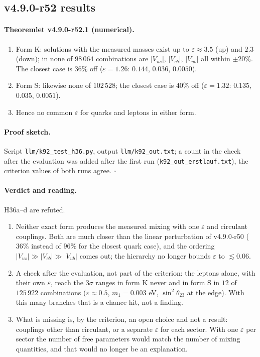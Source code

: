\subsection*{v4.9.0-r52 results}
\label{subsec:v490-r52-results}

\paragraph{Theoremlet v4.9.0-r52.1 (numerical).}
\begin{enumerate}[leftmargin=2em]
\item[(a)] Form K: solutions with the measured masses exist up to \(\varepsilon\approx3.5\) (up) and \(2.3\) (down); in none of \(98\,064\)
combinations are \(|V_{us}|\), \(|V_{cb}|\), \(|V_{ub}|\) all within \(\pm20\%\).  The closest case is \(36\%\) off
(\(\varepsilon=1.26\): \(0.144\), \(0.036\), \(0.0050\)).
\item[(b)] Form S: likewise none of \(102\,528\); the closest case is \(40\%\) off (\(\varepsilon=1.32\): \(0.135\), \(0.035\), \(0.0051\)).
\item[(c)] Hence no common \(\varepsilon\) for quarks and leptons in either form.
\end{enumerate}

\paragraph{Proof sketch.}
Script \texttt{llm/k92\_test\_h36.py}, output \texttt{llm/k92\_out.txt}; a count in the check after the evaluation was added after the first run
(\texttt{k92\_out\_erstlauf.txt}), the criterion values of both runs agree.  \(\square\)

\paragraph{Verdict and reading.}
H36a--d are refuted.
\begin{enumerate}[leftmargin=2em]
\item Neither exact form produces the measured mixing with one \(\varepsilon\) and circulant couplings.  Both are much closer than the linear
perturbation of v4.9.0-r50 (\(36\%\) instead of \(96\%\) for the closest quark case), and the ordering
\(|V_{us}|\gg|V_{cb}|\gg|V_{ub}|\) comes out; the hierarchy no longer bounds \(\varepsilon\) to \(\lesssim0.06\).
\item A check after the evaluation, not part of the criterion: the leptons alone, with their own \(\varepsilon\), reach the \(3\sigma\) ranges in
form K never and in form S in \(12\) of \(125\,922\) combinations (\(\varepsilon\approx0.5\), \(m_1=0.003\) eV, \(\sin^2\theta_{23}\) at the
edge).  With this many branches that is a chance hit, not a finding.
\item What is missing is, by the criterion, an open choice and not a result: couplings other than circulant, or a separate \(\varepsilon\) for each
sector.  With one \(\varepsilon\) per sector the number of free parameters would match the number of mixing quantities, and that would no longer
be an explanation.
\end{enumerate}

